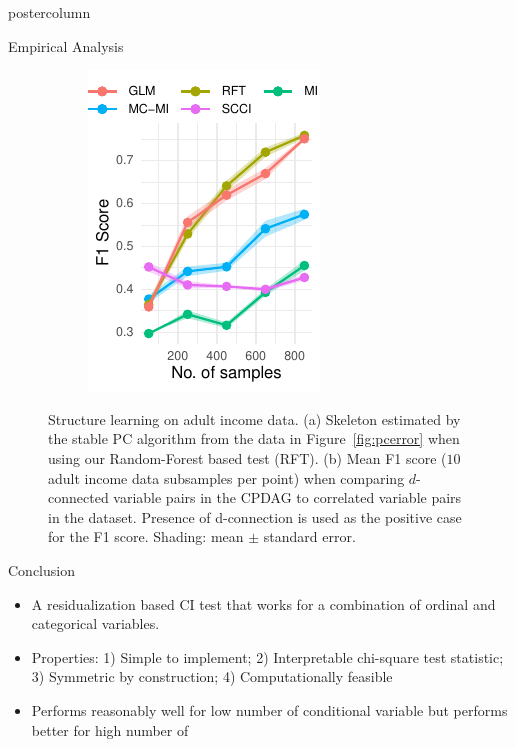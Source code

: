 \documentclass{beamer}
\begin{document}
\begin{frame}
\begin{columns}
\begin{column}{0.33\textwidth}
\begin{beamercolorbox}[center]{postercolumn}
\begin{minipage}{.98\textwidth}
{\begin{myblock}{Empirical Analysis}
\begin{figure}
\begin{subfigure}{0.6\columnwidth}
								\caption{}
								\label{fig:sl_adult_model}
							\end{subfigure}%
							\begin{subfigure}{0.4\columnwidth}
								\includegraphics[scale=2.5]{../in_person/imgs/adult_F1.pdf}
								\caption{}
								\label{fig:sl_adult}
							\end{subfigure}
							\caption{Structure learning on adult income data. (a) Skeleton
								estimated by the stable PC algorithm from the data in
								Figure~\ref{fig:pcerror} when using our Random-Forest based
								test (RFT). (b) Mean F1 score ($10$ adult income data subsamples
								per point)
								when comparing $d$-connected variable pairs in the CPDAG to
								correlated variable pairs in the dataset. Presence of
								d-connection is used as the positive case for the
								F1 score. Shading: mean $\pm$ standard
								error.}
						\end{figure}
					\end{myblock}\vfill
					\begin{myblock}{Conclusion}
						\begin{itemize}
							\item A residualization based CI test that works for a
								combination of ordinal and categorical variables.
							\item Properties: 1) Simple to implement; 2) Interpretable
								chi-square test statistic; 3) Symmetric by
								construction; 4) Computationally feasible
							\item Performs reasonably well for low number of conditional
								variable but performs better for high number of

\end{itemize}
\end{myblock}}
\end{minipage}
\end{beamercolorbox}
\end{column}
\end{columns}
\end{frame}
\end{document}
